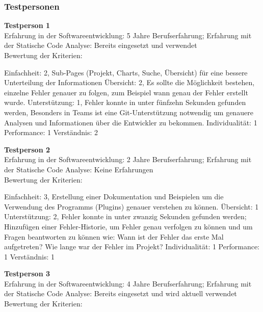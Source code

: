 \subsubsection{Testpersonen}
\textbf{Testperson 1} \\
Erfahrung in der Softwareentwicklung: 5 Jahre Berufserfahrung; Erfahrung mit der Statische Code Analyse: Bereits eingesetzt und verwendet \\
Bewertung der Kriterien:

Einfachheit: 2, Sub-Pages (Projekt, Charts, Suche, Übersicht) für eine bessere Unterteilung der Informationen \newline Übersicht: 2, Es sollte die Möglichkeit bestehen, einzelne Fehler genauer zu folgen, zum Beispiel wann genau der Fehler erstellt wurde. \newline  Unterstützung: 1, Fehler konnte in unter fünfzehn Sekunden gefunden werden, Besonders in Teams ist eine Git-Unterstützung notwendig um genauere Analysen und Informationen über die Entwickler zu bekommen.  \newline  Individualität: 1 \newline  Performance: 1 \newline  Verständnis: 2 \newline 

\textbf{Testperson 2} \\
Erfahrung in der Softwareentwicklung: 2 Jahre Berufserfahrung; Erfahrung mit der Statische Code Analyse: Keine Erfahrungen\\
Bewertung der Kriterien:

Einfachheit: 3, Erstellung einer Dokumentation und Beispielen um die Verwendung des Programms (Plugins) genauer verstehen zu können. \newline  Übersicht: 1 \newline  Unterstützung: 2, Fehler konnte in unter zwanzig Sekunden gefunden werden; Hinzufügen einer Fehler-Historie, um Fehler genau verfolgen zu können und um Fragen beantworten zu können wie: Wann ist der Fehler das erste Mal aufgetreten? Wie lange war der Fehler im Projekt? \newline  Individualität: 1 \newline  Performance: 1 \newline  Verständnis: 1 \newline 

\textbf{Testperson 3} \\
Erfahrung in der Softwareentwicklung: 4 Jahre Berufserfahrung; Erfahrung mit der Statische Code Analyse: Bereits eingesetzt und wird aktuell verwendet\\
Bewertung der Kriterien:

